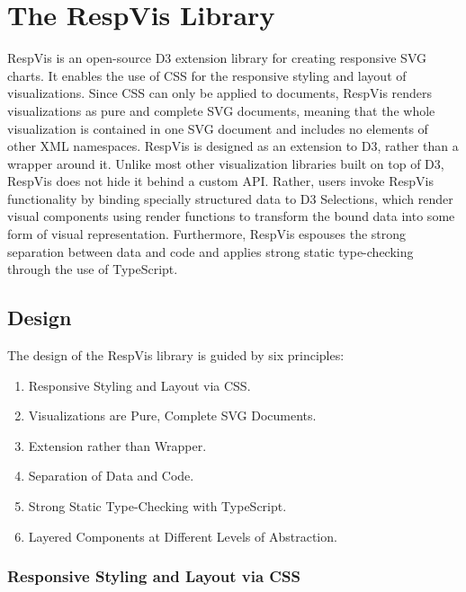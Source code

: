 
\chapter{The RespVis Library}
\label{chap:RespVis}

RespVis is an open-source D3 extension library for creating responsive
SVG charts. It enables the use of CSS for the responsive styling and
layout of visualizations.
Since CSS can only be applied to documents, RespVis renders
visualizations as pure and complete SVG documents, meaning that the
whole visualization is contained in one SVG document and includes no
elements of other XML namespaces. RespVis is designed as an extension
to D3, rather than a wrapper around it. Unlike most other
visualization libraries built on top of D3, RespVis does not hide it
behind a custom API. Rather, users invoke RespVis functionality by
binding specially structured data to D3 Selections, which render
visual components using render functions to transform the bound data
into some form of visual representation. Furthermore, RespVis espouses
the strong separation between data and code and applies strong static
type-checking through the use of TypeScript.



\section{Design}
\label{sec:Design}

The design of the RespVis library is guided by six principles:
\begin{enumerate}
\item Responsive Styling and Layout via CSS.
\item Visualizations are Pure, Complete SVG Documents.
\item Extension rather than Wrapper.
\item Separation of Data and Code.
\item Strong Static Type-Checking with TypeScript.
\item Layered Components at Different Levels of Abstraction.
\end{enumerate}



\subsection{Responsive Styling and Layout via CSS}

